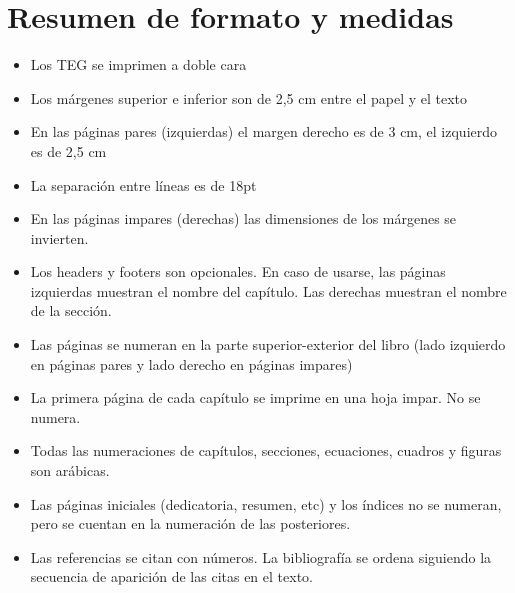 \chapter{Resumen de formato y medidas}
\begin{itemize}
\item Los TEG se imprimen a doble cara 
\item Los márgenes superior e inferior son de 2,5 cm entre el papel y el texto 
\item En las páginas pares (izquierdas) el margen derecho es de 3 cm, el izquierdo es de 2,5 cm
\item La separaci\'on entre l\'ineas es de 18pt 
\item En las páginas impares (derechas) las dimensiones de los márgenes se invierten.
\item Los headers y footers son opcionales. En caso de usarse, las páginas izquierdas muestran el nombre del capítulo. Las derechas muestran el nombre de la sección.
\item Las páginas se numeran en la parte superior-exterior del libro (lado izquierdo en páginas pares y lado derecho en páginas impares)
\item La primera página de cada capítulo se imprime en una hoja impar. No se numera.
\item Todas las numeraciones de capítulos, secciones, ecuaciones, cuadros y figuras son arábicas. 
\item Las páginas iniciales (dedicatoria, resumen, etc) y los índices no se numeran, pero se cuentan en la numeración de las posteriores.
\item Las referencias se citan con números. La bibliografía se ordena siguiendo la secuencia de aparición de las citas en el texto.
\end{itemize}
%
\cleardoublepage
\thispagestyle{empty}
\AddToShipoutPicture*{\BackgroundPic}
\leading{16pt}
